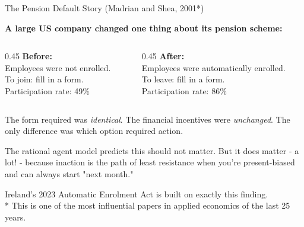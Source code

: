 \documentclass[10pt]{beamer}
\begin{document}
\begin{frame}{The Pension Default Story (Madrian and Shea, 2001*)}

\textbf{A large US company changed one thing about its pension scheme:}


\begin{columns}[T]
\begin{column}{0.45\textwidth}
\textbf{Before:}\\
Employees were not enrolled.\\
To join: fill in a form.\\

Participation rate: \alert{49\%}
\end{column}
\begin{column}{0.45\textwidth}
\textbf{After:}\\
Employees were automatically enrolled.\\
To leave: fill in a form.\\

Participation rate: \alert{86\%}
\end{column}
\end{columns}


The form required was \emph{identical}.
The financial incentives were \emph{unchanged}.
The only difference was which option required action.


\alert{The rational agent model predicts this should not matter.}
But it does matter - a lot! - because inaction is the path of least resistance when you're present-biased and can always start "next month."


\footnotesize Ireland's 2023 Automatic Enrolment Act is built on exactly this finding.\\
* This is one of the most influential papers in applied economics of the last 25 years.
\end{frame}
\end{document}
